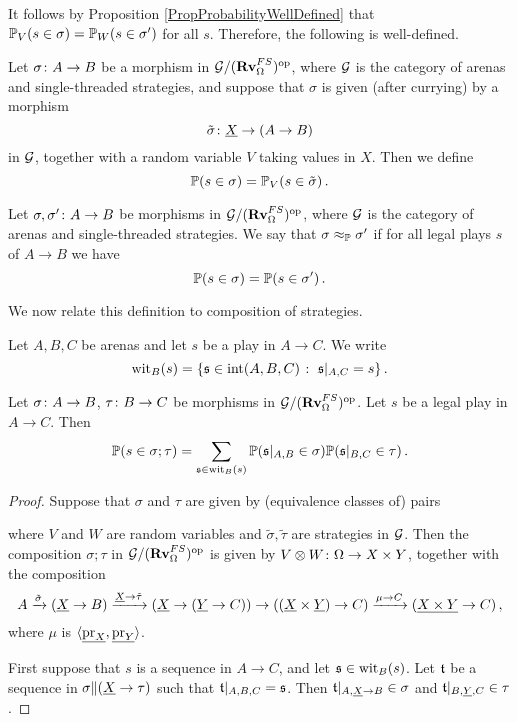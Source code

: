 \documentclass{report}[11pt]
\begin{document}
It follows by Proposition \ref{PropProbabilityWellDefined} that $\mathbb{P}_V(s\in\sigma)=\mathbb{P}_W(s\in\sigma')$ for all $s$.  
Therefore, the following is well-defined.

\begin{definition}
  Let $\sigma \colon A \to B$ be a morphism in $\mathcal G/({\normalfont\textbf{Rv}}_{\Omega}^{FS})^{\mathrm{op}}$, where $\mathcal G$ is the category of arenas and single-threaded strategies, and suppose that $\sigma$ is given (after currying) by a morphism
  \[
    \tilde\sigma \colon {\underline{X}} \to (A \to B)
    \]
  in $\mathcal G$, together with a random variable $V$ taking values in $X$.
  Then we define
  \[
    \mathbb{P}(s\in\sigma) = \mathbb{P}_V(s\in\tilde\sigma)\,.
    \]
\end{definition}

\begin{definition}
  Let $\sigma,\sigma'\colon A \to B$ be morphisms in $\mathcal G/({\normalfont\textbf{Rv}}_{\Omega}^{FS})^{\mathrm{op}}$, where $\mathcal G$ is the category of arenas and single-threaded strategies.  
  We say that $\sigma\approx_{\mathbb{P}}\sigma'$ if for all legal plays $s$ of $A \to B$ we have
  \[
    \mathbb{P}(s\in\sigma) = \mathbb{P}(s\in\sigma')\,.
    \]
\end{definition}

We now relate this definition to \Mellies composition of strategies.

\begin{definition}
  Let $A,B,C$ be arenas and let $s$ be a play in $A\to C$.  
  We write
  \[
    \operatorname{wit}_B(s) = \{\mathfrak s\in\operatorname{int}(A,B,C)\;\colon\; \mathfrak s\vert_{A,C}=s\}\,.
    \]
\end{definition}

\begin{proposition}
  Let $\sigma\colon A \to B$, $\tau\colon B \to C$ be morphisms in $\mathcal G/({\normalfont\textbf{Rv}}_{\Omega}^{FS})^{\mathrm{op}}$.  
  Let $s$ be a legal play in $A \to C$.
  Then
  \[
    \mathbb{P}(s\in\sigma;\tau) = \sum_{\mathfrak s\in\operatorname{wit}_B(s)}\mathbb{P}(\mathfrak s\vert_{A,B}\in\sigma)\mathbb{P}(\mathfrak s\vert_{B,C}\in\tau)\,.
    \]
\end{proposition}
\begin{proof}
  Suppose that $\sigma$ and $\tau$ are given by (equivalence classes of) pairs
  where $V$ and $W$ are random variables and $\tilde \sigma,\tilde\tau$ are strategies in $\mathcal G$.
  Then the composition $\sigma;\tau$ in $\mathcal G/({\normalfont\textbf{Rv}}_{\Omega}^{FS})^{\mathrm{op}}$ is given by $V\otimes W\colon\Omega \to X\times Y$, together with the \Mellies composition
  \[
    A \xrightarrow{\tilde\sigma}
    ({\underline{X}} \to B) \xrightarrow{{\underline{X}} \to \tilde\tau}
    ({\underline{X}} \to ({\underline{Y}} \to C)) \to
    (({\underline{X}} \times {\underline{Y}}) \to C) \xrightarrow{\mu\to C}
    ({\underline{X\times Y}} \to C)\,,
    \]
  where $\mu$ is $\langle{\underline{\operatorname{pr}_X}},{\underline{\operatorname{pr}_Y}}\rangle$.

  First suppose that $s$ is a sequence in $A \to C$, and let $\mathfrak s\in\operatorname{wit}_B(s)$.  
  Let $\mathfrak t$ be a sequence in $\sigma\|({\underline{X}} \to \tau)$ such that $\mathfrak t\vert_{A,B,C}=\mathfrak s$.  
  Then $\mathfrak t\vert_{A,{\underline{X}} \to B}\in\sigma$ and $\mathfrak t\vert_{B,{\underline{Y}},C}\in\tau$.
\end{proof}
\end{document}
